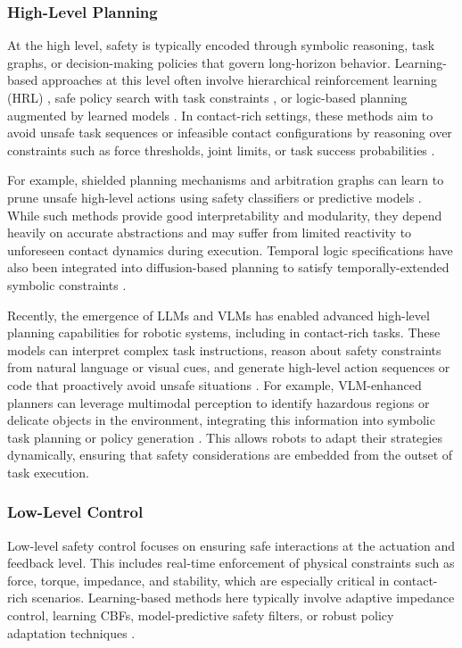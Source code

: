 \documentclass[Afour,sageh,times]{template/sagej}
\begin{document}
\subsubsection{High-Level Planning}
At the high level, safety is typically encoded through symbolic reasoning, task graphs, or decision-making policies that govern long-horizon behavior. 
Learning-based approaches at this level often involve hierarchical reinforcement learning (HRL) \cite{239, 365}, safe policy search with task constraints \cite{251, 47}, or logic-based planning augmented by learned models \cite{118, 311}.
In contact-rich settings, these methods aim to avoid unsafe task sequences or infeasible contact configurations by reasoning over constraints such as force thresholds, joint limits, or task success probabilities \cite{204, 208}.

For example, shielded planning mechanisms and arbitration graphs can learn to prune unsafe high-level actions using safety classifiers or predictive models \cite{212, 227, 292}. 
While such methods provide good interpretability and modularity, they depend heavily on accurate abstractions and may suffer from limited reactivity to unforeseen contact dynamics during execution.
Temporal logic specifications have also been integrated into diffusion-based planning to satisfy temporally-extended symbolic constraints \cite{218}.

Recently, the emergence of LLMs and VLMs has enabled advanced high-level planning capabilities for robotic systems, including in contact-rich tasks. 
These models can interpret complex task instructions, reason about safety constraints from natural language or visual cues, and generate high-level action sequences or code that proactively avoid unsafe situations \cite{8, 307, 330, 115}. 
For example, VLM-enhanced planners can leverage multimodal perception to identify hazardous regions or delicate objects in the environment, integrating this information into symbolic task planning or policy generation \cite{33, 51, 309, 360}. 
This allows robots to adapt their strategies dynamically, ensuring that safety considerations are embedded from the outset of task execution.
\subsubsection{Low-Level Control}
Low-level safety control focuses on ensuring safe interactions at the actuation and feedback level. This includes real-time enforcement of physical constraints such as force, torque, impedance, and stability, which are especially critical in contact-rich scenarios. 
Learning-based methods here typically involve adaptive impedance control, learning CBFs, model-predictive safety filters, or robust policy adaptation techniques
\citep{30}.
\end{document}
